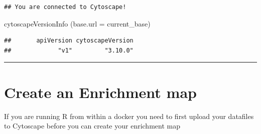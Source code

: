 \documentclass[
]{book}
\newenvironment{Shaded}{\begin{snugshade}}{\end{snugshade}}
\newcommand{\AttributeTok}[1]{\textcolor[rgb]{0.77,0.63,0.00}{#1}}
\newcommand{\FunctionTok}[1]{\textcolor[rgb]{0.00,0.00,0.00}{#1}}
\newcommand{\NormalTok}[1]{#1}
\begin{document}
\begin{verbatim}
## You are connected to Cytoscape!
\end{verbatim}

\begin{Shaded}
\begin{Highlighting}[]
\FunctionTok{cytoscapeVersionInfo}\NormalTok{ (}\AttributeTok{base.url =}\NormalTok{ current\_base)}
\end{Highlighting}
\end{Shaded}

\begin{verbatim}
##       apiVersion cytoscapeVersion 
##             "v1"         "3.10.0"
\end{verbatim}

\begin{center}\rule{0.5\linewidth}{0.5pt}\end{center}

\hypertarget{create-an-enrichment-map}{%
\section{Create an Enrichment map}\label{create-an-enrichment-map}}

If you are running R from within a docker you need to first upload your datafiles to Cytoscape before you can create your enrichment map
\end{document}
